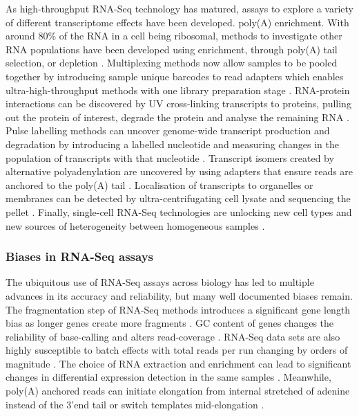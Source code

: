 \documentclass[../main.tex]{subfiles}
\begin{document}
As high-throughput RNA-Seq technology has matured, assays to explore a variety of different transcriptome effects have been developed.
poly(A) enrichment.
With around 80\% of the RNA in a cell being ribosomal, methods to investigate other RNA populations have been developed using enrichment, through poly(A) tail selection, or depletion \parencite{Stark2019}. 
Multiplexing methods now allow samples to be pooled together by introducing sample unique barcodes to read adapters which enables ultra-high-throughput methods with one library preparation stage \parencite{Craig2008}.
RNA-protein interactions can be discovered by UV cross-linking transcripts to proteins, pulling out the protein of interest, degrade the protein and analyse the remaining RNA \parencite{Granneman2009}.
Pulse labelling methods can uncover genome-wide transcript production and degradation by introducing a labelled nucleotide and measuring changes in the population of transcripts with that nucleotide \parencite{Chan2018}.
Transcript isomers created by alternative polyadenylation are uncovered by using adapters that ensure reads are anchored to the poly(A) tail \parencite{Pelechano2013}. 
Localisation of transcripts to organelles or membranes can be detected by ultra-centrifugating cell lysate and sequencing the pellet \parencite{Iserman2020}.
Finally, single-cell RNA-Seq technologies are unlocking new cell types and new sources of heterogeneity between homogeneous samples \parencite{Jovic2022}.

\subsubsection{Biases in RNA-Seq assays}

The ubiquitous use of RNA-Seq assays across biology has led to multiple advances in its accuracy and reliability, but many well documented biases remain.
The fragmentation step of RNA-Seq methods introduces a significant gene length bias as longer genes create more fragments \parencite{Oshlack2009}.
GC content of genes changes the reliability of base-calling and alters read-coverage \parencite{Dohm2008}.
RNA-Seq data sets are also highly susceptible to batch effects with total reads per run changing by orders of magnitude \parencite{Auer2010}.
The choice of RNA extraction and enrichment can lead to significant changes in differential expression detection in the same samples \parencite{Sultan2014}.
Meanwhile, poly(A) anchored reads can initiate elongation from internal stretched of adenine instead of the 3'end tail or switch templates mid-elongation \parencite{Balazs2019}.
\end{document}
